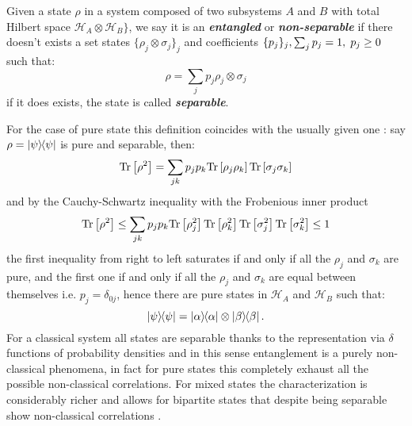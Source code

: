 \begin{definition}
  Given a state $\rho$ in a system composed of two subsystems $A$ and $B$ with total Hilbert space $\mathcal{H}_{A}\otimes \mathcal{H}_{B}\}$, we say it is
  an \textbf{\textit{entangled}} or \textit{\textbf{non-separable}} if there doesn't exists a set states $\{\rho_{j}\otimes \sigma_{j}\}_{j}$ and coefficients
  $\{p_{j}\}_{j},  \sum_{j}p_{j}=1, \hspace{0.1cm} p_{j}\geq 0$ such that:
  \begin{equation}
    \rho = \sum_{j}p_{j}\rho_{j}\otimes \sigma_{j}
  \end{equation}
  if it does exists, the state is called \textbf{\textit{separable}}.
\end{definition}
For the case of pure state this definition coincides with the usually given one \cite{nielsen_quantum_2010}: say $\rho=\ketbra{\psi}$ is pure and separable, then:
\begin{equation}
  \mathrm{Tr}\left[\rho^{2}\right] = \sum_{jk}p_{j}p_{k}\mathrm{Tr}\left[\rho_{j}\rho_{k}\right]\mathrm{Tr}\left[\sigma_{j}\sigma_{k}\right]
\end{equation}
and by the Cauchy-Schwartz inequality with the Frobenious inner product
\begin{equation}
  \mathrm{Tr}\left[\rho^{2}\right] \leq \sum_{jk}p_{j}p_{k}\mathrm{Tr}\left[\rho_{j}^{2}\right]\mathrm{Tr}\left[\rho_{k}^{2}\right]\mathrm{Tr}\left[\sigma_{j}^{2}\right]\mathrm{Tr}\left[\sigma_{k}^{2}\right] \leq 1
\end{equation}
the first inequality from right to left saturates if and only if all the $\rho_{j}$ and $\sigma_{k}$ are pure, and the first one if
and only if all the $\rho_{j}$ and $\sigma_{k}$ are equal between themselves i.e. $p_{j}=\delta_{0j}$, hence there are pure states
in $\mathcal{H}_{A}$ and $\mathcal{H}_{B}$ such that:
\begin{equation}
  \ketbra{\psi} = \ketbra{\alpha}\otimes\ketbra{\beta}.
\end{equation}
For a classical system all states are separable thanks to the representation via $\delta$ functions
of probability densities \cite{diosi_short_2011} and in this sense entanglement is a purely non-classical phenomena, in fact for pure states
this completely exhaust all the possible non-classical correlations. For mixed states the characterization is considerably richer
and allows for bipartite states that despite being separable show non-classical correlations \cite{adesso2016introduction}.
